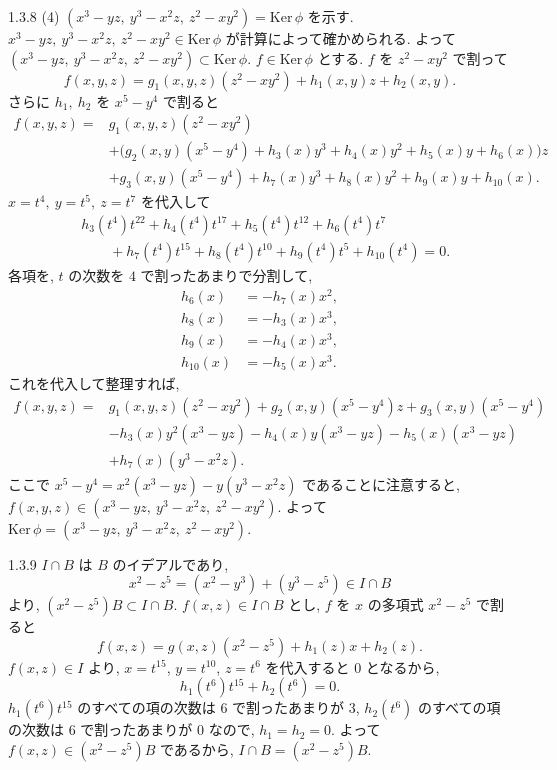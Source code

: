 \begin{ans}{1.3.8}
  \medskip
  (4) $(x^3 - yz,\ y^3 - x^2 z,\ z^2 - xy^2) = \mathrm{Ker}\,\phi$ を示す.
  $x^3 - yz,\ y^3 - x^2 z,\ z^2 - xy^2 \in \mathrm{Ker}\,\phi$ が計算によって確かめられる.
  よって $(x^3 - yz,\ y^3 - x^2 z,\ z^2 - xy^2) \subset \mathrm{Ker}\,\phi$.
  $f \in \mathrm{Ker}\,\phi$ とする.
  $f$ を $z^2 - xy^2$ で割って
  \[
    f(x,y,z) = g_1(x,y,z)(z^2 - xy^2) + h_1(x,y)z + h_2(x,y).
  \]
  さらに $h_1,\ h_2$ を $x^5 - y^4$ で割ると
  \begin{align*}
    f(x,y,z) = {}& g_1(x,y,z)(z^2 - xy^2) \\
    & + \bigl(g_2(x,y)(x^5 - y^4) + h_3(x)y^3 + h_4(x)y^2 + h_5(x)y + h_6(x)\bigr)z \\
    & + g_3(x,y)(x^5 - y^4) + h_7(x)y^3 + h_8(x)y^2 + h_9(x)y + h_{10}(x).
  \end{align*}
  $x = t^4,\ y = t^5,\ z = t^7$ を代入して
  \begin{align*}
    & h_3(t^4)t^{22} + h_4(t^4)t^{17} + h_5(t^4)t^{12} + h_6(t^4)t^7 \\
    & \qquad + h_7(t^4)t^{15} + h_8(t^4)t^{10} + h_9(t^4)t^5 + h_{10}(t^4) = 0.
  \end{align*}
  各項を, $t$ の次数を $4$ で割ったあまりで分割して,
  \begin{align*}
    h_6(x) &= -h_7(x)x^2, \\
    h_8(x) &= -h_3(x)x^3, \\
    h_9(x) &= -h_4(x)x^3, \\
    h_{10}(x) &= -h_5(x)x^3.
  \end{align*}
  これを代入して整理すれば,
  \begin{align*}
    f(x,y,z) = {}& g_1(x,y,z)(z^2 - xy^2) + g_2(x,y)(x^5 - y^4)z + g_3(x,y)(x^5 - y^4) \\
    & - h_3(x)y^2(x^3 - yz) - h_4(x)y(x^3 - yz) - h_5(x)(x^3 - yz) \\
    & + h_7(x)(y^3 - x^2 z).
  \end{align*}
  ここで $x^5 - y^4 = x^2(x^3 - yz) - y(y^3 - x^2 z)$ であることに注意すると,
  $f(x,y,z) \in (x^3 - yz,\ y^3 - x^2 z,\ z^2 - xy^2)$.
  よって $\mathrm{Ker}\,\phi = (x^3 - yz,\ y^3 - x^2 z,\ z^2 - xy^2)$.
\end{ans}

\begin{ans}{1.3.9}
  $I \cap B$ は $B$ のイデアルであり,
  \[
    x^2 - z^5 = (x^2 - y^3) + (y^3 - z^5) \in I \cap B
  \]
  より, $(x^2 - z^5)B \subset I \cap B$.
  $f(x,z) \in I \cap B$ とし, $f$ を $x$ の多項式 $x^2 - z^5$ で割ると
  \[
    f(x,z) = g(x,z)(x^2 - z^5) + h_1(z)x + h_2(z).
  \]
  $f(x,z) \in I$ より, $x = t^{15}$, $y = t^{10}$, $z = t^6$ を代入すると $0$ となるから,
  \[
    h_1(t^6)t^{15} + h_2(t^6) = 0.
  \]
  $h_1(t^6)t^{15}$ のすべての項の次数は $6$ で割ったあまりが $3$,
  $h_2(t^6)$ のすべての項の次数は $6$ で割ったあまりが $0$ なので, $h_1 = h_2 = 0$.
  よって $f(x,z) \in (x^2 - z^5)B$ であるから, $I \cap B = (x^2 - z^5)B$.
\end{ans}

